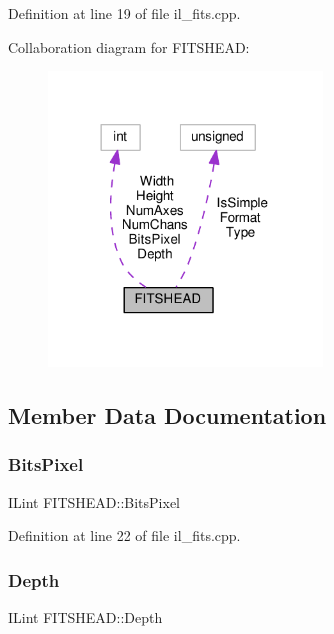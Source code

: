 Definition at line 19 of file il\+\_\+fits.\+cpp.



Collaboration diagram for F\+I\+T\+S\+H\+E\+AD\+:
\nopagebreak
\begin{figure}[H]
\begin{center}
\leavevmode
\includegraphics[width=206pt]{d8/d0e/structFITSHEAD__coll__graph}
\end{center}
\end{figure}


\subsection{Member Data Documentation}
\mbox{\label{structFITSHEAD_a41fd3391f357c24281930357f4beb509}} 
\subsubsection{\texorpdfstring{Bits\+Pixel}{BitsPixel}}
{\footnotesize\ttfamily I\+Lint F\+I\+T\+S\+H\+E\+A\+D\+::\+Bits\+Pixel}



Definition at line 22 of file il\+\_\+fits.\+cpp.

\mbox{\label{structFITSHEAD_adacb27c796d622189ee6fb54470d0800}} 
\subsubsection{\texorpdfstring{Depth}{Depth}}
{\footnotesize\ttfamily I\+Lint F\+I\+T\+S\+H\+E\+A\+D\+::\+Depth}



